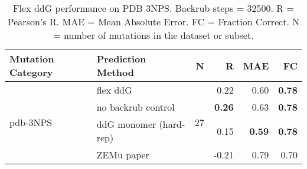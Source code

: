 \begin{table}
  \begin{tabular}{llrrrr}
\toprule
Mutation Category &       Prediction Method &   N &     R &  MAE &   FC \\
\midrule
 \multirow{ 4}{*}{pdb-3NPS} & flex ddG & \multirow{ 4}{*}{27} & 0.22 & 0.60 & \textbf{0.78}  \\
 & no backrub control & & \textbf{0.26} & 0.63 & \textbf{0.78}  \\
 & ddG monomer (hard-rep) & & 0.15 & \textbf{0.59} & \textbf{0.78}  \\
 & ZEMu paper & & -0.21 & 0.79 & 0.70  \\
\bottomrule
\end{tabular}
  \caption[Flex ddG performance on PDB 3NPS]{
    Flex ddG performance on PDB 3NPS. Backrub steps = 32500. R = Pearson's R. MAE = Mean Absolute Error. FC = Fraction Correct. N = number of mutations in the dataset or subset.
  } \label{tab:table-pdb-3NPS}
\end{table}
